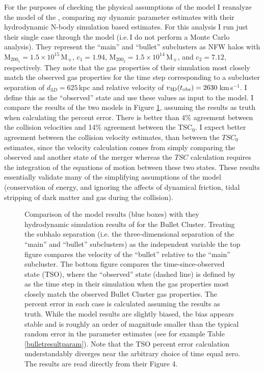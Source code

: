 \documentclass[12pt]{emulateapj}
\begin{document}
For the purposes of checking the physical assumptions of the model I reanalyze the \citet{Springel:2007bg} model of the , comparing my dynamic parameter estimates with their hydrodynamic N-body simulation based estimates.
For this analysis I run just their single case through the model (i.e.\,I do not perform a Monte Carlo analysis).
They represent the ``main'' and ``bullet'' subclusters as NFW halos with  M$_{200_1} = 1.5\times 10^{15} $\,M$_\sun$, c$_1=1.94$, M$_{200_2} = 1.5\times 10^{14}$\,M$_\sun$, and c$_2=7.12$, respectively.
They note that the gas properties of their simulation most closely match the observed  gas properties for the time step corresponding to a subcluster separation of $d_{3D}=625$\,kpc and  relative velocity of $v_{\rm 3D}(t_{\rm obs})=2630$\,km\,s$^{-1}$.
I define this as the ``observed'' state and use these values as input to the model.  
I compare the results of the two models in Figure \ref{fig_SFcomparison}, assuming the \citet{Springel:2007bg} results as truth when calculating the percent error.
There is better than 4\% agreement between the collision velocities and 14\% agreement between the TSC$_0$.  
I expect better agreement between the collision velocity estimates, than between the $TSC_0$ estimates, since the velocity calculation comes from simply comparing the observed and another state of the merger whereas the $TSC$ calculation requires the integration of the equations of motion between these two states.
These results essentially validate many of the simplifying assumptions of the model (conservation of energy, and ignoring the affects of dynamical friction, tidal stripping of dark matter and gas during the collision).

\begin{figure}
\caption{
Comparison of the model results (blue boxes) with they hydrodynamic simulation results of \citet[black circles;][]{Springel:2007bg} for the Bullet Cluster.  
Treating the subhalo separation (i.e. the three-dimensional separation of the ``main'' and ``bullet'' subclusters) as the independent variable the top figure compares the velocity of the ``bullet'' relative to the ``main'' subcluster.  
The bottom figure compares the time-since-observed state (TSO), where the ``observed'' state (dashed line) is defined by \citet{Springel:2007bg} as the time step in their simulation when the gas properties most closely match the observed Bullet Cluster gas properties.  
The percent error in each case is calculated assuming the \citet{Springel:2007bg} results as truth.  
While the model results are slightly biased, the bias appears stable and is roughly an order of magnitude smaller than the typical random error in the parameter estimates (see for example Table \ref{bulletresultparam}).  
Note that the TSO percent error calculation understandably diverges near the arbitrary choice of time equal zero. 
The \citet{Springel:2007bg} results are read directly from their Figure 4.
\label{fig_SFcomparison}}
\end{figure}
\end{document}
